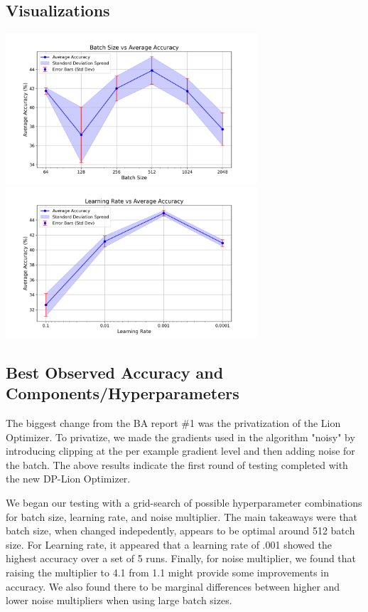 \subsection{Visualizations}\label{subsec:best-accuracy-viz2}
\includegraphics[width=0.7\textwidth]{batch_size_vs_accuracy.png}
\includegraphics[width=0.7\textwidth]{learning_rate_vs_accuracy.png}

\subsection{Best Observed Accuracy and Components/Hyperparameters}\label{subsec:best-accuracy}
The biggest change from the BA report \#1 was the privatization of the Lion Optimizer. To privatize, we made the gradients used in the algorithm "noisy" by introducing clipping
at the per example gradient level and then adding noise for the batch. The above results indicate the first round of testing completed with the new DP-Lion Optimizer.

We began our testing with a grid-search of possible hyperparameter combinations for batch size, learning rate, and noise multiplier. The main takeaways were that batch size,
when changed indepedently, appears to be optimal around 512 batch size. For Learning rate, it appeared that a learning rate of .001 showed the highest accuracy over a set of 5
runs. Finally, for noise multiplier, we found that raising the multiplier to 4.1 from 1.1 might provide some improvements in accuracy. We also found there to be marginal differences
between higher and lower noise multipliers when using large batch sizes.


